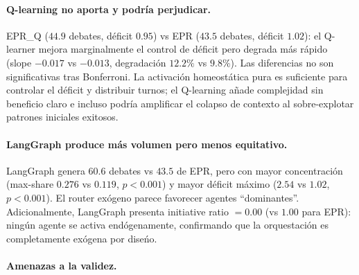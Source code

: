 \documentclass{llncs}
\begin{document}
\paragraph{Q-learning no aporta y podr\'ia perjudicar.}
EPR\_Q ($44.9$ debates, d\'eficit $0.95$) vs EPR ($43.5$ debates, d\'eficit
$1.02$): el Q-learner mejora marginalmente el control de d\'eficit pero
degrada m\'as r\'apido (slope $-0.017$ vs $-0.013$, degradaci\'on $12.2\%$
vs $9.8\%$). Las diferencias no son significativas tras Bonferroni.
La activaci\'on homeost\'atica pura es suficiente para controlar el
d\'eficit y distribuir turnos; el Q-learning a\~nade complejidad sin
beneficio claro e incluso podr\'ia amplificar el colapso de contexto al
sobre-explotar patrones iniciales exitosos.

\paragraph{LangGraph produce m\'as volumen pero menos equitativo.}
LangGraph genera $60.6$ debates vs $43.5$ de EPR, pero con mayor
concentraci\'on (max-share $0.276$ vs $0.119$, $p<0.001$) y mayor d\'eficit
m\'aximo ($2.54$ vs $1.02$, $p<0.001$). El router ex\'ogeno parece favorecer
agentes ``dominantes''. Adicionalmente, LangGraph presenta initiative ratio $=0.00$ (vs $1.00$
para EPR): ning\'un agente se activa end\'ogenamente, confirmando que la
orquestaci\'on es completamente ex\'ogena por dise\'no.

\paragraph{Amenazas a la validez.}
\end{document}
